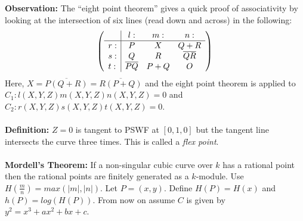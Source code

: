 {\bf Observation:}  The ``eight point theorem'' gives a quick proof of associativity by
looking at the intersection of six lines (read down and across) in the following:
$$
\left(
\begin{array}{l | c c c}
 & l: & m: & n:\\
\hline
r: & P & X & Q+R\\
s: & Q & R & {\overline {QR}}\\
t: & {\overline {PQ}} & P+Q & O\\
\end{array}
\right)$$
Here, $X= {\overline {P(Q+R)}}= {\overline {R(P+Q)}}$ and the eight point theorem
is applied to 
$C_1: l(X,Y,Z) m(X,Y,Z) n(X,Y,Z)= 0$ and $C_2: r(X,Y,Z) s(X,Y,Z) t(X,Y,Z)= 0$.
\\
\\
{\bf Definition:}  $Z=0$ is tangent to PSWF at $[0,1,0]$ but the tangent line intersects
the curve three times. This is called a \emph{flex point}.
\\
\\
{\bf Mordell's Theorem:}  If a non-singular cubic curve over $k$ has a rational point then
the rational points are finitely generated as a $k$-module.
Use $H({\frac m n})= max(|m|, |n|)$. Let $P=(x,y)$.  Define $H(P)= H(x)$ and
$h(P)= log(H(P))$.  From now on assume $C$ is given by
$y^2= x^3 + ax^2 + bx +c$.
